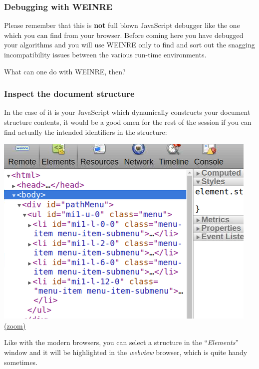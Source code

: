 \documentclass[11pt]{article}
\begin{document}
    \hypertarget{debugging-with-weinre}{%
\subsubsection{Debugging with WEINRE}\label{debugging-with-weinre}}

    Please remember that this is \textbf{not} full blown JavaScript debugger
like the one which you can find from your browser. Before coming here
you have debugged your algorithms and you will use WEINRE only to find
and sort out the snagging incompatibility issues between the various
run-time environments.

    What can one do with WEINRE, then?

    \hypertarget{inspect-the-document-structure}{%
\subsubsection{Inspect the document
structure}\label{inspect-the-document-structure}}

    In the case of it is your JavaScript which dynamically constructs your
document structure contents, it would be a good omen for the rest of the
session if you can find actually the intended identifiers in the
structure:

    \includegraphics{2019-12-25_weinre_server_element_inspection.png}
\href{img/2019-12-25_weinre_server_element_inspection.png}{(zoom)}

    Like with the modern browsers, you can select a structure in the
``\emph{Elements}'' window and it will be highlighted in the
\emph{webview} browser, which is quite handy sometimes.
\end{document}
